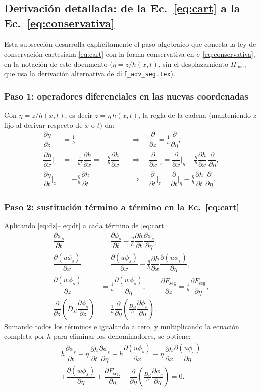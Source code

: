 \documentclass[11pt,a4paper]{article}
\newcommand{\pd}[2]{\dfrac{\partial #1}{\partial #2}}
\begin{document}
\subsection{Derivación detallada: de la Ec.~\eqref{eq:cart} a la Ec.~\eqref{eq:conservativa}}
\label{sec:derivacion}
Esta subsección desarrolla explícitamente el paso algebraico que conecta
la ley de conservación cartesiana \eqref{eq:cart} con la forma
conservativa en $\sigma$ \eqref{eq:conservativa}, en la notación de este
documento ($\eta = z/h(x,t)$, sin el desplazamiento $H_{\mathrm{base}}$
que usa la derivación alternativa de \texttt{dif\_adv\_seg.tex}).

\subsubsection{Paso 1: operadores diferenciales en las nuevas coordenadas}
Con $\eta = z/h(x,t)$, es decir $z = \eta\,h(x,t)$, la regla de la cadena
(manteniendo $z$ fijo al derivar respecto de $x$ o $t$) da:
\begin{align}
    \pd{\eta}{z} &= \frac{1}{h}
    &&\Longrightarrow\quad
    \boxed{\pd{}{z} = \frac{1}{h}\pd{}{\eta}}, \label{eq:dz}\\[6pt]
    \pd{\eta}{x}\bigg|_z &= -\frac{z}{h^2}\pd{h}{x} = -\frac{\eta}{h}\pd{h}{x}
    &&\Longrightarrow\quad
    \boxed{\pd{}{x}\bigg|_z = \pd{}{x}\bigg|_\eta - \frac{\eta}{h}\pd{h}{x}\,\pd{}{\eta}}, \label{eq:dx}\\[6pt]
    \pd{\eta}{t}\bigg|_z &= -\frac{\eta}{h}\pd{h}{t}
    &&\Longrightarrow\quad
    \boxed{\pd{}{t}\bigg|_z = \pd{}{t}\bigg|_\eta - \frac{\eta}{h}\pd{h}{t}\,\pd{}{\eta}}. \label{eq:dt}
\end{align}

\subsubsection{Paso 2: sustitución término a término en la Ec.~\eqref{eq:cart}}
Aplicando \eqref{eq:dz}--\eqref{eq:dt} a cada término de \eqref{eq:cart}:
\begin{align}
    \pd{\phi_s}{t} &= \pd{\phi_s}{t} - \frac{\eta}{h}\pd{h}{t}\pd{\phi_s}{\eta}, \\
    \pd{(u\phi_s)}{x} &= \pd{(u\phi_s)}{x} - \frac{\eta}{h}\pd{h}{x}\pd{(u\phi_s)}{\eta}, \\
    \pd{(w\phi_s)}{z} &= \frac1h\pd{(w\phi_s)}{\eta}, \qquad
    \pd{F_{\mathrm{seg}}}{z} = \frac1h\pd{F_{\mathrm{seg}}}{\eta}, \\
    \pd{}{z}\!\left(D_{sl}\pd{\phi_s}{z}\right) &= \frac1h\pd{}{\eta}\!\left(\frac{D_{sl}}{h}\pd{\phi_s}{\eta}\right).
\end{align}
Sumando todos los términos e igualando a cero, y multiplicando la
ecuación completa por $h$ para eliminar los denominadores, se obtiene:
\begin{multline}
    h\pd{\phi_s}{t} - \eta\,\pd{h}{t}\pd{\phi_s}{\eta}
    + h\pd{(u\phi_s)}{x} - \eta\,\pd{h}{x}\pd{(u\phi_s)}{\eta} \\
    + \pd{(w\phi_s)}{\eta} + \pd{F_{\mathrm{seg}}}{\eta}
    - \pd{}{\eta}\!\left(\frac{D_{sl}}{h}\pd{\phi_s}{\eta}\right) = 0.
    \label{eq:ast}
\end{multline}
\end{document}
